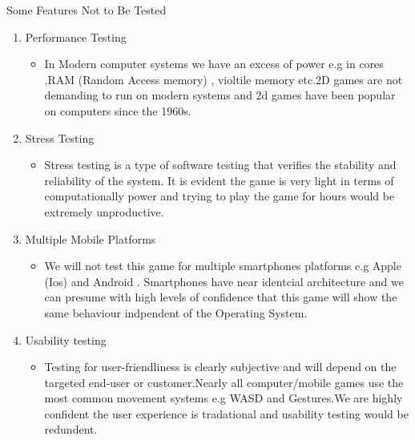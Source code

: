 



\centerline{Some Features Not to Be Tested
}

\begin{enumerate}
   \item Performance Testing 
   \begin{itemize}
     \item  In Modern computer systems we have an excess of power e.g in cores ,RAM (Random Access memory) , violtile memory etc.2D games are not demanding to run on modern systems and 2d games have been popular on computers since the 1960s.
   \end{itemize}
  
  \item Stress Testing
   \begin{itemize}
     \item Stress testing is a type of software testing that verifies the stability and reliability of the system. It is evident the game is very light in terms of computationally power and trying to play the game for hours would be extremely unproductive.

   \end{itemize}

     \item Multiple Mobile Platforms
   \begin{itemize}
     \item We will not test this game for multiple smartphones platforms e.g Apple (Ios) and Android . Smartphones have near identcial architecture and we can presume with high levels of confidence that this game will show the same behaviour indpendent of the Operating System.
   \end{itemize}



 \item Usability testing
   \begin{itemize}
 	\item 
 	 Testing for user-friendliness is clearly subjective and will depend on the targeted end-user or customer.Nearly all computer/mobile games use the most common movement systems e.g WASD and Gestures.We  are highly confident the user experience is tradational and usability testing would be redundent.
 	 \end{itemize}
 	 \end{enumerate}
